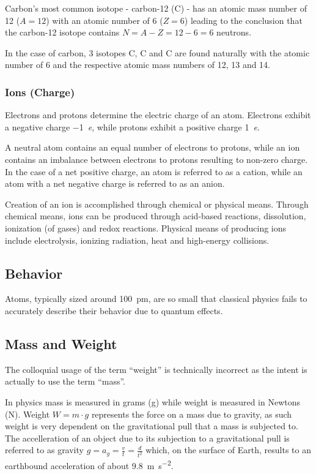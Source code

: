 Carbon's most common isotope -  carbon-12 (C) - has an atomic mass
number of 12 ($A = 12$) with an atomic number of 6 ($Z = 6$) leading to the
conclusion that the carbon-12 isotope contains $N=A-Z=12-6=6$ neutrons.

In the case of carbon, 3 isotopes C, C and
C are found naturally with the atomic number of 6 and the
respective atomic mass numbers of 12, 13 and 14.

\subsubsection{Ions (Charge)}

Electrons and protons determine the electric charge of an atom. Electrons
exhibit a negative charge \SI{-1}{\elementarycharge}, while protons exhibit a
positive charge \SI{1}{\elementarycharge}.

A neutral atom contains an equal number of electrons to protons, while an ion
contains an imbalance between electrons to protons resulting to non-zero charge.
In the case of a net positive charge, an atom is referred to as a
cation, while an atom with a net negative charge is referred to as
an anion.

Creation of an ion is accomplished through chemical or physical means. Through
chemical means, ions can be produced through acid-based reactions, dissolution,
ionization (of gases) and redox reactions. Physical means of producing ions
include electrolysis, ionizing radiation, heat and high-energy collisions.

\subsection{Behavior} Atoms, typically sized around \SI{100}{\pico\meter}, are
so small that classical physics fails to accurately describe their behavior due
to quantum effects.

\subsection{Mass and Weight} The colloquial usage of the term ``weight'' is
technically incorrect as the intent is actually to use the term ``mass''.

In physics mass is measured in grams (\si{\gram}) while weight is measured in
Newtons (\si{\newton}).  Weight $W = m\cdot g$ represents the
force on a mass due to gravity, as such weight is very dependent on the
gravitational pull that a mass is subjected to.  The accelleration of an object
due to its subjection to a gravitational pull is referred to as
gravity $g = a_g = \frac{v}{t} = \frac{d}{t^2}$ which, on the
surface of Earth, results to an earthbound acceleration of about
\SI{9.8}{\meter\second^{-2}}.


